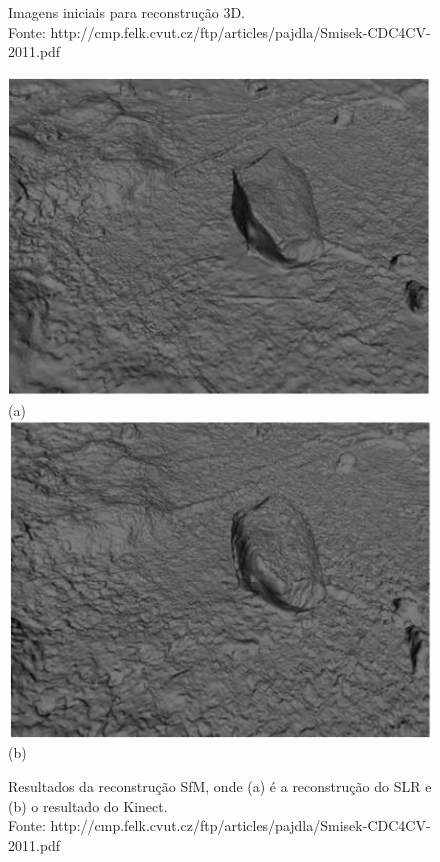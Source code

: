 \documentclass[table, usenames, svgnames, xcolor=dvipsnames]{beamer}
\begin{document}
\begin{frame} 
	\begin{center}
		\begin{figure}
		\caption{%
		Imagens iniciais para reconstrução 3D. \\
		\tiny{Fonte: http://cmp.felk.cvut.cz/ftp/articles/pajdla/Smisek-CDC4CV-2011.pdf}
		}
		\end{figure}
	\end{center}
\end{frame}

\begin{frame}
	\begin{center}
		\begin{figure}
			\centering
			\includegraphics[width=0.3\linewidth]{figs/imagemMVS.png}(a)
			\includegraphics[width=0.3\linewidth]{figs/imagemMVSKinect.png}(b)
			\caption{%
			Resultados da reconstrução SfM, onde (a) é a reconstrução do SLR e (b) o resultado do Kinect. \\
			\tiny{Fonte: http://cmp.felk.cvut.cz/ftp/articles/pajdla/Smisek-CDC4CV-2011.pdf}
			}
			\end{figure}
	\end{center}
\end{frame}
\end{document}
